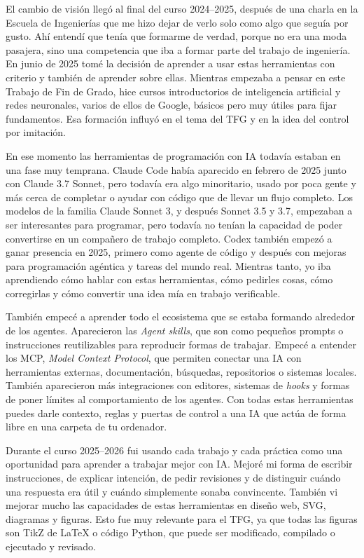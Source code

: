 El cambio de visión llegó al final del curso 2024--2025, después de una charla en
la Escuela de Ingenierías que me hizo dejar de verlo solo como algo que seguía por
gusto. Ahí entendí que tenía que formarme de verdad, porque no era una moda
pasajera, sino una competencia que iba a formar parte del trabajo de ingeniería.
En junio de 2025 tomé la decisión de aprender a usar estas herramientas con
criterio y también de aprender sobre ellas. Mientras empezaba a pensar en este
Trabajo de Fin de Grado, hice cursos introductorios de inteligencia artificial y redes
neuronales, varios de ellos de Google, básicos pero muy útiles para fijar fundamentos.
Esa formación influyó en el tema del TFG y en la idea del control por imitación.

En ese momento las herramientas de programación con IA todavía estaban en una
fase muy temprana. Claude Code había aparecido en febrero de 2025 junto con
Claude 3.7 Sonnet, pero todavía era algo minoritario, usado por poca
gente y más cerca de completar o ayudar con código que de llevar un flujo completo.
Los modelos de la familia Claude Sonnet 3, y después Sonnet 3.5 y 3.7,
empezaban a ser interesantes para programar, pero todavía no tenían la capacidad
de poder convertirse en un compañero de trabajo completo. Codex también empezó
a ganar presencia en 2025, primero como agente de código y después con mejoras para 
programación agéntica y tareas del mundo real. Mientras tanto, yo iba aprendiendo
cómo hablar con estas herramientas, cómo pedirles cosas, cómo corregirlas y
cómo convertir una idea mía en trabajo verificable.

También empecé a aprender todo el ecosistema que se estaba formando alrededor de
los agentes. Aparecieron las \textit{Agent skills}, que son como pequeños
prompts o instrucciones reutilizables para reproducir formas de trabajar. Empecé
a entender los MCP, \textit{Model Context Protocol}, que permiten conectar una IA
con herramientas externas, documentación, búsquedas, repositorios o sistemas
locales. También aparecieron más integraciones con editores, sistemas de \textit{hooks}
y formas de poner límites al comportamiento de los agentes. Con todas estas herramientas
puedes darle contexto, reglas y puertas de control a una IA que actúa de forma libre en una
carpeta de tu ordenador. 

Durante el curso 2025--2026 fui usando cada trabajo y cada práctica como una oportunidad
para aprender a trabajar mejor con IA. Mejoré mi forma de escribir instrucciones,
de explicar intención, de pedir revisiones y de distinguir cuándo una respuesta
era útil y cuándo simplemente sonaba convincente. También vi mejorar mucho las
capacidades de estas herramientas en diseño web, SVG, diagramas y figuras. Esto fue
muy relevante para el TFG, ya que todas las figuras son TikZ de LaTeX o código Python,
que puede ser modificado, compilado o ejecutado y revisado.

